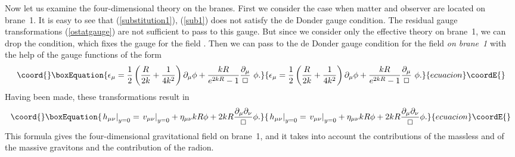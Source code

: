 \documentclass[a4paper,12pt]{article}
\begin{document}
Now let us examine the four-dimensional theory on the branes. First we
consider the case when matter and observer are located on brane~1.
It is easy to see that \coordHE{} (\ref{substitution1}),
(\ref{sub1}) does not satisfy the de Donder gauge condition. The
residual gauge transformations (\ref{ostatgauge}) are not
sufficient to pass to this gauge. But since we consider only the
effective theory on brane~1, we can drop the
\coordHE{} condition, which fixes the gauge for the
field \coordHE{}. Then we can pass to the  de Donder gauge
condition for the field  \coordHE{} {\it on brane~1} with the
help of the gauge functions of the form
\begin{equation}\coord{}\boxEquation{\label{gfunc}
\epsilon_{\mu}=\frac{1}{2}\left(\frac{R}{2k}+\frac{1}{4k^2}\right)\partial_{\mu}\phi+
\frac{kR}{e^{2kR}-1}\frac{\partial_{\mu}}{\Box} \ \phi.
}{\epsilon_{\mu}=\frac{1}{2}\left(\frac{R}{2k}+\frac{1}{4k^2}\right)\partial_{\mu}\phi+
\frac{kR}{e^{2kR}-1}\frac{\partial_{\mu}}{\Box} \ \phi.
}{ecuacion}\coordE{}\end{equation}
Having been made, these transformations result in
\begin{equation}\coord{}\boxEquation{\label{honbrane1}
\left. h_{\mu\nu}\right|_{y=0}=\left.
v_{\mu\nu}\right|_{y=0}+\eta_{\mu\nu}kR\phi+
2kR\frac{\partial_{\mu}\partial_{\nu}}{\Box}\phi.
}{\left. h_{\mu\nu}\right|_{y=0}=\left.
v_{\mu\nu}\right|_{y=0}+\eta_{\mu\nu}kR\phi+
2kR\frac{\partial_{\mu}\partial_{\nu}}{\Box}\phi.
}{ecuacion}\coordE{}\end{equation}
This formula gives the four-dimensional gravitational
field on brane~1, and it takes into account the  contributions of the massless and
of the massive gravitons and the contribution of the radion.
\end{document}
